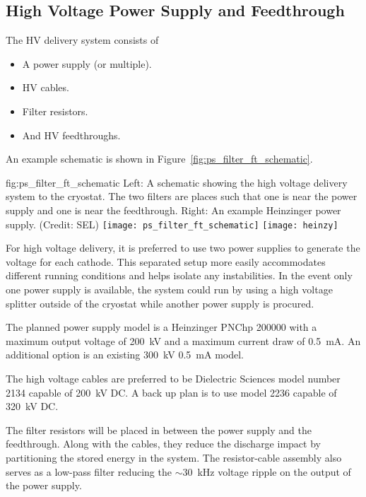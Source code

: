 \subsection {High Voltage Power Supply and Feedthrough}
The HV delivery system consists of
\begin{itemize}
\item A power supply (or multiple).
\item HV cables.
\item Filter resistors.
\item And HV feedthroughs.
\end{itemize}
\noindent An example schematic is shown in Figure~\ref{fig:ps_filter_ft_schematic}.

\begin{dunefigure}{fig:ps_filter_ft_schematic}
{Left:  A schematic showing the high voltage delivery system to the cryostat.  The two filters are places such that one is near the power supply and one is near the feedthrough. Right:  An example Heinzinger power supply.  (Credit: SEL)}
\texttt{[image: ps\_filter\_ft\_schematic]}
\texttt{[image: heinzy]}
\end{dunefigure}

For high voltage delivery, it is preferred to use two power supplies to generate the voltage for each cathode. This separated setup more easily accommodates different running conditions and helps isolate any instabilities.  In the event only one power supply is available, the system could run by using a high voltage splitter outside of the cryostat while another power supply is procured.

The planned power supply model is a Heinzinger PNChp 200000 with a maximum output voltage of \SI{200}{kV} and a maximum current draw of \SI{0.5}{mA}.  An additional option is an existing \SI{300}{kV} \SI{0.5}{mA} model. 

The high voltage cables are preferred to be Dielectric Sciences model number 2134 capable of \SI{200}{kV} DC.  A back up plan is to use model 2236 capable of \SI{320}{kV} DC.  

The filter resistors will be placed in between the power supply and the feedthrough.  Along with the cables, they reduce the discharge impact by partitioning the stored energy in the system.  The resistor-cable assembly also serves as a low-pass filter reducing the $\sim$\SI{30}{kHz} voltage ripple on the output of the power supply.

